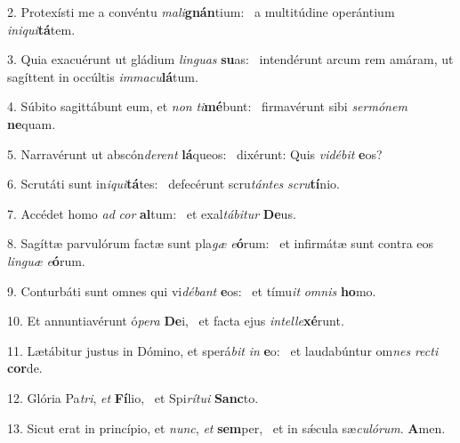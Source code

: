 2. Protexísti me a convéntu \textit{ma}\textit{li}\textbf{gnán}tium: \ast\  a multitúdine operántium \textit{in}\textit{i}\textit{qui}\textbf{tá}tem.\

3. Quia exacuérunt ut gládium \textit{lin}\textit{guas} \textbf{su}as: \ast\  intendérunt arcum rem amáram, ut sagíttent in occúltis \textit{im}\textit{ma}\textit{cu}\textbf{lá}tum.\

4. Súbito sagittábunt eum, et \textit{non} \textit{ti}\textbf{mé}bunt: \ast\  firmavérunt sibi \textit{ser}\textit{mó}\textit{nem} \textbf{ne}quam.\

5. Narravérunt ut abscón\textit{de}\textit{rent} \textbf{lá}queos: \ast\  dixérunt: Quis \textit{vi}\textit{dé}\textit{bit} \textbf{e}os?\

6. Scrutáti sunt in\textit{i}\textit{qui}\textbf{tá}tes: \ast\  defecérunt scru\textit{tán}\textit{tes} \textit{scru}\textbf{tí}nio.\

7. Accédet homo \textit{ad} \textit{cor} \textbf{al}tum: \ast\  et exal\textit{tá}\textit{bi}\textit{tur} \textbf{De}us.\

8. Sagíttæ parvulórum factæ sunt pla\textit{gæ} \textit{e}\textbf{ó}rum: \ast\  et infirmátæ sunt contra eos \textit{lin}\textit{guæ} \textit{e}\textbf{ó}rum.\

9. Conturbáti sunt omnes qui vi\textit{dé}\textit{bant} \textbf{e}os: \ast\  et tímu\textit{it} \textit{om}\textit{nis} \textbf{ho}mo.\

10. Et annuntiavérunt ó\textit{pe}\textit{ra} \textbf{De}i, \ast\  et facta ejus \textit{in}\textit{tel}\textit{le}\textbf{xé}runt.\

11. Lætábitur justus in Dómino, et sperá\textit{bit} \textit{in} \textbf{e}o: \ast\  et laudabúntur om\textit{nes} \textit{rec}\textit{ti} \textbf{cor}de.\

12. Glória Pa\textit{tri}, \textit{et} \textbf{Fí}lio, \ast\  et Spi\textit{rí}\textit{tu}\textit{i} \textbf{Sanc}to.\

13. Sicut erat in princípio, et \textit{nunc}, \textit{et} \textbf{sem}per, \ast\  et in sǽcula sæ\textit{cu}\textit{ló}\textit{rum}. \textbf{A}men.\


